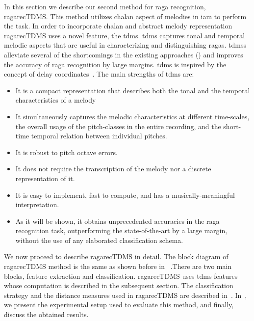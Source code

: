 In this section we describe our second method for \gls{raga} recognition, \acrshort{ragarecTDMS}. This method utilizes \gls{chalan} aspect of melodies in \gls{iam} to perform the task. In order to incorporate \gls{chalan} and abstract melody representation \acrshort{ragarecTDMS} uses a novel feature,  the \acrfull{tdms}. \gls{tdms} captures tonal and temporal melodic aspects that are useful in characterizing and distinguishing \glspl{raga}. \Glspl{tdms} alleviate several of the shortcomings in the existing approaches () and improves the accuracy of \gls{raga} recognition by large margins. \Gls{tdms} is inspired by the concept of delay coordinates~\citep{takens1981detecting}. The main strengths of \gls{tdms} are:

\begin{itemize}
	\item It is a compact representation that describes both the tonal and the temporal characteristics of a melody
	\item It simultaneously captures the melodic characteristics at different time-scales, the overall usage of the pitch-classes in the entire recording, and the short-time temporal relation between individual pitches.
	\item It is robust to pitch octave errors.
	\item It does not require the transcription of the melody nor a discrete representation of it.
	\item It is easy to implement, fast to compute, and has a musically-meaningful interpretation.
	\item As it will be shown, it obtains unprecedented accuracies in the raga recognition task, outperforming the state-of-the-art by a large margin, without the use of any elaborated classification schema.
\end{itemize}

We now proceed to describe \acrshort{ragarecTDMS} in detail. The block diagram of \acrshort{ragarecTDMS} method is the same as shown before in~ .There are two main blocks, feature extraction and classification. \acrshort{ragarecTDMS} uses \gls{tdms} features whose computation is described in the subsequent section. The classification strategy and the distance measures used in \acrshort{ragarecTDMS} are described in~. In~, we present the experimental setup used to evaluate this method, and finally, discuss the obtained results. 


